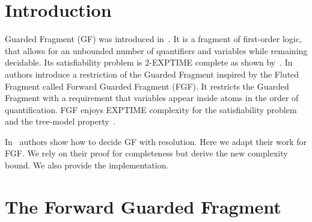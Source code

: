 \documentclass[english, shortabstract]{iithesis}
\author         {Karol Ochman-Milarski}
\theoremstyle{definition} \newtheorem{definition}{Definition}[chapter]
\theoremstyle{remark} \newtheorem{remark}[definition]{Observation}
\theoremstyle{plain} \newtheorem{theorem}[definition]{Theorem}
\theoremstyle{plain} \newtheorem{lemma}[definition]{Lemma}
\begin{document}

\chapter{Introduction}

Guarded Fragment (GF) was introduced in~\cite{benthem}.
It is a fragment of first-order logic, that allows for an unbounded number of quantifiers and variables while remaining decidable.
Its satisfiability problem is 2-EXPTIME complete as shown by~\cite{gradel}.
In~\cite{bbe} authors introduce a restriction of the Guarded Fragment inspired by the Fluted Fragment \cite{fluted} called Forward Guarded Fragment (FGF).
It restricts the Guarded Fragment with a requirement that variables appear inside atoms in the order of quantification.
FGF enjoys EXPTIME complexity for the satisfiability problem and the tree-model property~\cite{bbe}.
\par In~\cite{nivelle} authors show how to decide GF with resolution. Here we adapt their work for FGF.
We rely on their proof for completeness but derive the new complexity bound. We also provide the implementation.

\chapter{The Forward Guarded Fragment}
\end{document}
